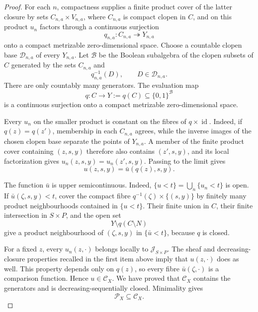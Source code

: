\begin{proof}
For each \(n\), compactness supplies a finite product cover of the latter
closure by sets \(C_{n,a}\times V_{n,a}\), where \(C_{n,a}\) is compact
clopen in \(C\), and on this product \(u_n\) factors through a continuous
surjection
\[
                        q_{n,a}:C_{n,a}\twoheadrightarrow Y_{n,a}
\]
onto a compact metrizable zero-dimensional space.  Choose a countable
clopen base \(\mathcal D_{n,a}\) of every \(Y_{n,a}\).  Let
\(\mathcal B\) be the Boolean subalgebra of the clopen subsets of \(C\)
generated by the sets \(C_{n,a}\) and
\[
                         q_{n,a}^{-1}(D),
                         \qquad D\in\mathcal D_{n,a}.
\]
There are only countably many generators.  The evaluation map
\begin{equation}
 q:C\longrightarrow
 Y:=q(C)\subseteq\{0,1\}^{\mathcal B}
 \label{eq:p071-stone-star-common-quotient}
\end{equation}
is a continuous surjection onto a compact metrizable zero-dimensional
space.

Every \(u_n\) on the smaller product is constant on the fibres of
\(q\times\operatorname{id}\).  Indeed, if \(q(z)=q(z')\), membership in
each \(C_{n,a}\) agrees, while the inverse images of the chosen clopen base
separate the points of \(Y_{n,a}\).  A member of the finite product cover
containing \((z,s,y)\) therefore also contains \((z',s,y)\), and its local
factorization gives \(u_n(z,s,y)=u_n(z',s,y)\).  Passing to the limit gives
\begin{equation}
                        u(z,s,y)=\bar u(q(z),s,y).
 \label{eq:p071-stone-star-limit-factor}
\end{equation}

The function \(\bar u\) is upper semicontinuous.  Indeed,
\(\{u<t\}=\bigcup_n\{u_n<t\}\) is open.  If
\(\bar u(\zeta,s,y)<t\), cover the compact fibre
\(q^{-1}(\zeta)\times\{(s,y)\}\) by finitely many product neighbourhoods
contained in \(\{u<t\}\).  Their finite union in \(C\), their finite
intersection in \(S\times P\), and the open set
\[
                         Y\setminus q(C\setminus N)
\]
give a product neighbourhood of \((\zeta,s,y)\) in
\(\{\bar u<t\}\), because \(q\) is closed.

For a fixed \(z\), every \(u_n(z,\cdot)\) belongs locally to
\(\mathcal J_{S\times P}\).  The sheaf and decreasing-closure properties
recalled in the first item above imply that \(u(z,\cdot)\) does as well.
This property depends only on \(q(z)\), so every fibre
\(\bar u(\zeta,\cdot)\) is a comparison function.  Hence
\(u\in\mathcal C_X\).  We have proved that \(\mathcal C_X\) contains the
generators and is decreasing-sequentially closed.  Minimality gives
\begin{equation}
                          \mathcal P_X\subseteq\mathcal C_X.
 \label{eq:p071-stone-star-minimality}
\end{equation}


\end{proof}
